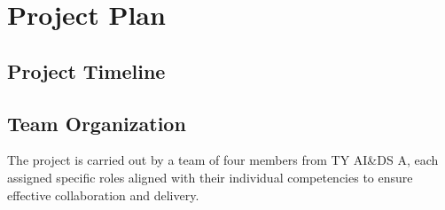 \chapter{Project Plan}
\section{Project Timeline}

\createGanttChart

\section{Team Organization}
The project is carried out by a team of four members from TY AI\&DS A, each assigned specific roles aligned with their individual competencies to ensure effective collaboration and delivery.\\

